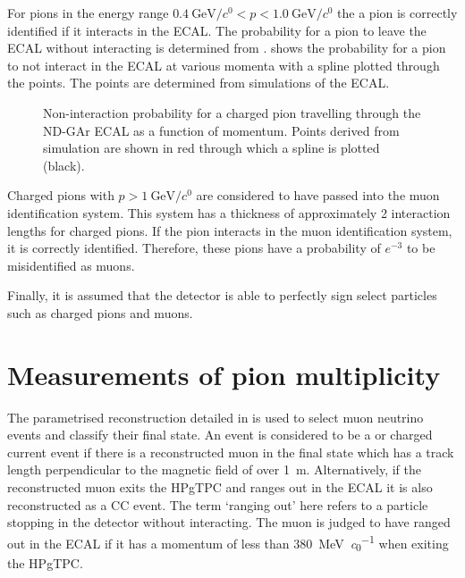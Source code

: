 For pions in the energy range $\SI{0.4}{\GeV\per\clight} < p < \SI{1.0}{\GeV\per\clight}$ the
a pion is correctly identified if it interacts in the ECAL.
The probability for a pion to leave the ECAL without interacting is determined from .
 shows the probability for a pion to not interact in the ECAL at various momenta with a spline plotted through the points.
The points are determined from simulations of the ECAL.

\begin{figure}[h]
	\centering
	\begin{adjustbox}{max totalsize=.6\linewidth, center}
		
	\end{adjustbox}
	\caption[Non-interaction probability for a charged pion travelling through the ND-GAr ECAL as a function of momentum]{Non-interaction probability for a charged pion travelling through the ND-GAr ECAL as a function of momentum. Points derived from simulation are shown in red through which a spline is plotted (black).}
	\label{fig:interactionSpline}
\end{figure}

Charged pions with $p>\SI{1}{\GeV\per\clight}$ are considered to have passed into the muon identification system. 
This system has a thickness of approximately 2 interaction lengths for charged pions.
If the pion interacts in the muon identification system, it is correctly identified.
Therefore, these pions have a probability of $e^{-3}$ to be misidentified as muons.

Finally, it is assumed that the detector is able to perfectly sign select particles such as charged pions and muons.

\section{Measurements of pion multiplicity}
\label{sec:dune_ndrwt:pionMulti}

The parametrised reconstruction detailed in  is used to select muon neutrino events and classify their final state.
An event is considered to be a \numu or \anumu charged current event if there is a reconstructed muon in the final state which has a track length perpendicular to the magnetic field of over \SI{1}{\metre}.
Alternatively, if the reconstructed muon exits the HPgTPC and ranges out in the ECAL it is also reconstructed as a \numu CC event.
The term `ranging out' here refers to a particle stopping in the detector without interacting.
The muon is judged to have ranged out in the ECAL if it has a momentum of less than \SI{380}{\MeV\per\clight} when exiting the HPgTPC. 


